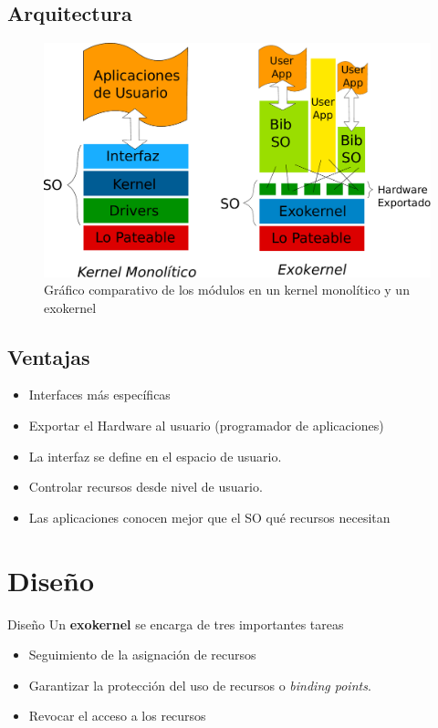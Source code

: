 \documentclass[10pt]{beamer}
\begin{document}
\subsection{Arquitectura}
\begin{frame}
\begin{figure}[H]
\centering
\includegraphics[scale=0.3]{grafico-kernel-exokernel.pdf}
\caption{Gráfico comparativo de los módulos en un kernel monolítico y un exokernel}
\end{figure}
\end{frame}

\subsection{Ventajas}
\begin{frame}
\begin{itemize}
  \item Interfaces más específicas
  \item Exportar el Hardware al usuario (programador de aplicaciones)
  \item La interfaz se define en el espacio de usuario.
  \item Controlar recursos desde nivel de usuario.
  \item Las aplicaciones conocen mejor que el SO qué recursos necesitan
\end{itemize}
\end{frame}

\section{Diseño}
\begin{frame}{Diseño}
Un \textbf{exokernel} se encarga de tres importantes tareas

\begin{itemize}
  \item Seguimiento de la asignación de recursos
  \item Garantizar la protección del uso de recursos o \textit{binding points}.
  \item Revocar el acceso a los recursos
\end{itemize}

\end{frame}
\end{document}

